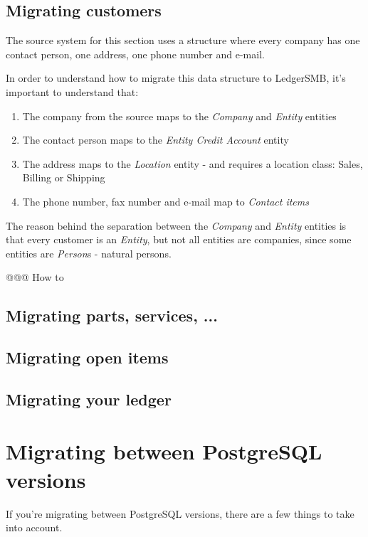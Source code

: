 \subsection{Migrating customers}

The source system for this section uses a structure where every company has one
contact person, one address, one phone number and e-mail.

In order to understand how to migrate this data structure to LedgerSMB, it's
important to understand that:

\begin{enumerate}
\item The company from the source maps to the \emph{Company} and \emph{Entity} entities
\item The contact person maps to the \emph{Entity Credit Account} entity
\item The address maps to the \emph{Location} entity - and requires a location class: Sales, Billing or Shipping
\item The phone number, fax number and e-mail map to \emph{Contact items}
\end{enumerate}

The reason behind the separation between the \emph{Company} and \emph{Entity} entities
is that every customer is an \emph{Entity}, but not all entities are companies, since
some entities are \emph{Person}s - natural persons.

@@@ How to

\subsection{Migrating parts, services, ...}
\subsection{Migrating open items}
\subsection{Migrating your ledger}

\section{Migrating between PostgreSQL versions}
\label{sec:MigrationBetweenPostgreSQLVersions}

If you're migrating between PostgreSQL versions, there are a few things to take
into account.


